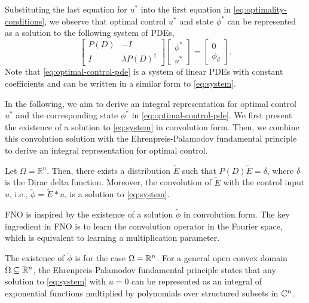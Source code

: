 \documentclass[letterpaper, 10 pt, conference]{ieeeconf}  %
\begin{document}
Substituting the last equation for $u^*$ into the first equation in \eqref{eq:optimality-conditions}, we observe that optimal control $u^*$ and state $\phi^*$ can be represented as a solution to the following system of PDEs,
\begin{equation}\label{eq:optimal-control-pde}
   \begin{bmatrix}
      P(D) & -I \\
      I & \lambda P(D)^\dagger
   \end{bmatrix}
   \begin{bmatrix}
      \phi^* \\
      u^*
   \end{bmatrix}
   = \begin{bmatrix}
      0 \\
      \phi_d
   \end{bmatrix}.
\end{equation}
Note that \eqref{eq:optimal-control-pde} is a system of linear PDEs with constant coefficients and can be written in a similar form to \eqref{eq:system}. 

In the following, we aim to derive an integral representation for optimal control $u^*$ and the corresponding state $\phi^*$ in \eqref{eq:optimal-control-pde}.
We first present the existence of a solution to \eqref{eq:system} in convolution form.
Then, we combine this convolution solution with the Ehrenpreis-Palamodov fundamental principle \cite{ehrenpreis1970fourier,palamodov1970linear} to derive an integral representation for optimal control.

\begin{lemma}\label{lemma:fundamental-solution}
   Let $\Omega = \mathbb{R}^n$. Then, there exists a distribution $\tilde{E}$ such that $P(D) \tilde{E} = \delta$, where $\delta$ is the Dirac delta function. Moreover, the convolution of $\tilde{E}$ with the control input $u$, i.e., $\tilde{\phi} = \tilde{E} \ast u$, is a solution to \eqref{eq:system}.
\end{lemma}

\begin{remark}
   FNO is inspired by the existence of a solution $\tilde{\phi}$ in convolution form. 
The key ingredient in FNO is to learn the convolution operator in the Fourier space, which is equivalent to learning a multiplication parameter. 
\end{remark}

The existence of $\tilde{\phi}$ is for the case $\Omega=\mathbb{R}^n$.
For a general open convex domain $\Omega\subseteq\mathbb{R}^n$, the Ehrenpreis-Palamodov fundamental principle states that any solution to \eqref{eq:system} with $u=0$ can be represented as an integral of exponential functions multiplied by polynomials over structured subsets in $\mathbb{C}^n$.
\end{document}
